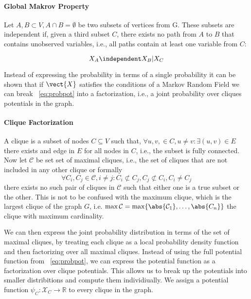 \paragraph*{Global Makrov Property}
Let $A, B \subset V, A \cap B = \emptyset$ be two subsets of vertices from G. 
These subsets are independent if, given a third subset $C$, there exists no path from $A$ to $B$ that contains unobserved variables, i.e., all paths contain at least one variable from $C$:

\begin{equation}
    X_A \independent X_B \lvert X_C
\end{equation}

Instead of expressing the probability in terms of a single probability  it can be shown that if $\vect{X}$ satisfies the conditions of a Markov Random Field we can break \eq~\ref{eq:probpot} into a factorization, i.e., a joint probability over cliques potentials in the graph.

\paragraph*{Clique Factorization}

A clique is a subset of nodes $C \subseteq V$ such that, $\forall u,v,  \in C, u \neq v: \exists (u,v) \in E$ there exists and edge in $E$ for all nodes in $C$, i.e., the subset is fully connected.
Now let $\mathcal{C}$ be set set of maximal cliques, i.e., the set of cliques that are not included in any other clique or formally 
\begin{equation}
    \forall C_i, C_j \in \mathcal{C}, i \neq j  : C_i \not\subset C_j, C_j \not\subset C_i, C_i \neq C_j
\end{equation}
there exists no such pair of cliques in $\mathcal{C}$ such that either one is a true subset or the other.
This is not to be confused with the maximum clique, which is the largest clique of the graph $G$, i.e. $\max \mathcal{C} = \max \{\abs{\mathcal{C}_1}, \ldots, \abs{C_n}\}$ the clique with maximum cardinality.

We can then express the joint probability distribution in terms of the set of maximal cliques, by treating each clique as a local probability density function and then factorizing over all maximal cliques.
Instead of using the full potential function from \eq~\ref{eq:probpot}, we can express the potential function as a factorization over clique potentials.
This allows us to break up the potentials into smaller distribitions and compute them individiually. 
We assign a potential function $\psi_C: \mathcal{X}_C \rightarrow \mathbb{R}$ to every clique in the graph.


